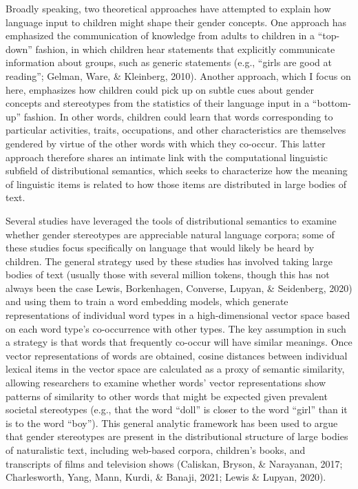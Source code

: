 \documentclass[10pt, letterpaper]{article}
\begin{document}
Broadly speaking, two theoretical approaches have attempted to explain
how language input to children might shape their gender concepts. One
approach has emphasized the communication of knowledge from adults to
children in a ``top-down'' fashion, in which children hear statements
that explicitly communicate information about groups, such as generic
statements (e.g., {``girls are good at reading''}; Gelman, Ware, \&
Kleinberg, 2010). Another approach, which I focus on here, emphasizes
how children could pick up on subtle cues about gender concepts and
stereotypes from the statistics of their language input in a
``bottom-up'' fashion. In other words, children could learn that words
corresponding to particular activities, traits, occupations, and other
characteristics are themselves gendered by virtue of the other words
with which they co-occur. This latter approach therefore shares an
intimate link with the computational linguistic subfield of
distributional semantics, which seeks to characterize how the meaning of
linguistic items is related to how those items are distributed in large
bodies of text.

Several studies have leveraged the tools of distributional semantics to
examine whether gender stereotypes are appreciable natural language
corpora; some of these studies focus specifically on language that would
likely be heard by children. The general strategy used by these studies
has involved taking large bodies of text (usually those with several
million tokens, though this has not always been the case Lewis,
Borkenhagen, Converse, Lupyan, \& Seidenberg, 2020) and using them to
train a word embedding models, which generate representations of
individual word types in a high-dimensional vector space based on each
word type's co-occurrence with other types. The key assumption in such a
strategy is that words that frequently co-occur will have similar
meanings. Once vector representations of words are obtained, cosine
distances between individual lexical items in the vector space are
calculated as a proxy of semantic similarity, allowing researchers to
examine whether words' vector representations show patterns of
similarity to other words that might be expected given prevalent
societal stereotypes (e.g., that the word ``doll'' is closer to the word
``girl'' than it is to the word ``boy''). This general analytic
framework has been used to argue that gender stereotypes are present in
the distributional structure of large bodies of naturalistic text,
including web-based corpora, children's books, and transcripts of films
and television shows (Caliskan, Bryson, \& Narayanan, 2017;
Charlesworth, Yang, Mann, Kurdi, \& Banaji, 2021; Lewis \& Lupyan,
2020).
\end{document}
